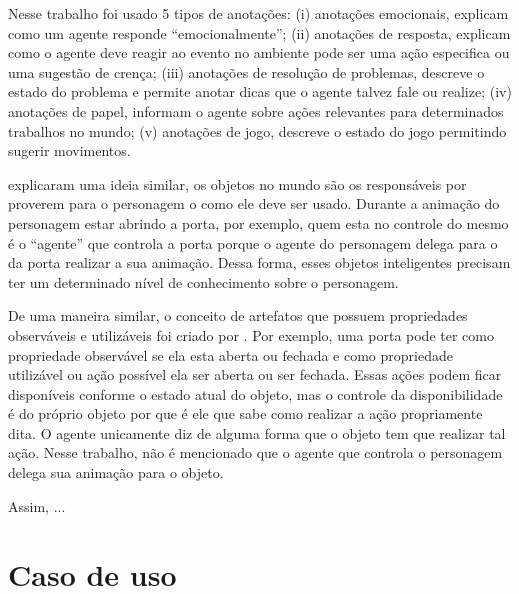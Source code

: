 Nesse trabalho foi usado 5 tipos de anotações: (i) anotações emocionais,
explicam como um agente responde ``emocionalmente''; (ii) anotações de
resposta, explicam como o agente deve reagir ao evento no ambiente pode ser
uma ação especifica ou uma sugestão de crença; (iii) anotações de resolução de
problemas, descreve o estado do problema  e permite anotar dicas que o agente
talvez fale ou realize; (iv) anotações de papel, informam o agente sobre ações
relevantes para determinados trabalhos no mundo; (v) anotações de jogo,
descreve o estado do jogo permitindo sugerir movimentos.

\citet{kallmann1999modeling} explicaram uma ideia similar, os objetos no mundo
são os responsáveis por proverem para o personagem o como ele deve ser usado.
Durante a animação do personagem estar abrindo a porta, por exemplo, quem esta
no controle do mesmo é o ``agente'' que controla a porta porque o agente do
personagem delega para o da porta realizar a sua animação. Dessa forma,
esses objetos inteligentes precisam ter um determinado nível de conhecimento
sobre o personagem.

De uma maneira similar, o conceito de artefatos que possuem propriedades
observáveis e utilizáveis foi criado por \citet{ricci31cartago}. Por exemplo,
uma porta pode ter como propriedade observável se ela esta aberta ou fechada e
como propriedade utilizável ou ação possível ela ser aberta ou ser fechada.
Essas ações podem ficar disponíveis conforme o estado atual do objeto, mas o
controle da disponibilidade é do próprio objeto por que é ele que sabe como
realizar a ação propriamente dita. O agente unicamente diz de alguma forma que
o objeto tem que realizar tal ação. Nesse trabalho, não é mencionado que o
agente que controla o personagem delega sua animação para o objeto.

Assim, ...


%

\section{Caso de uso} \label{cap:tp:cdu}

